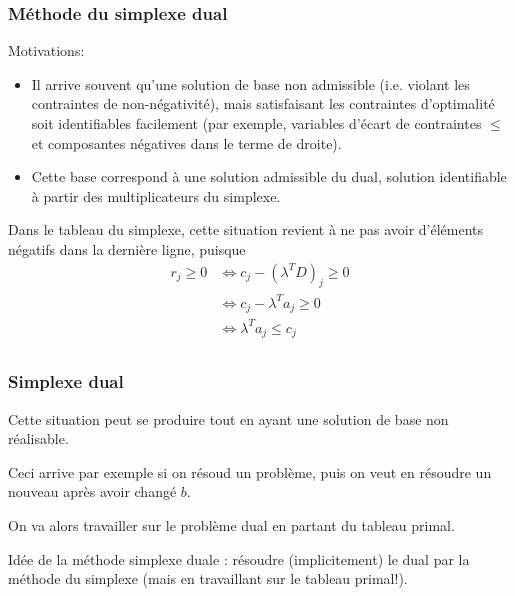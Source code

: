 \documentclass[usepdftitle=false]{beamer}
\begin{document}
\begin{frame}
\frametitle{Méthode du simplexe dual}

Motivations:
\begin{itemize}
\item
Il arrive souvent qu’une solution de base non admissible (i.e. violant les contraintes de non-négativité), mais satisfaisant les contraintes d'optimalité soit identifiables facilement (par exemple, variables d’écart de contraintes $\leq$ et composantes négatives dans le terme de droite).
\item
Cette base correspond à une solution admissible du dual, solution identifiable à partir des multiplicateurs du simplexe.
\end{itemize}


\mbox{}

Dans le tableau du simplexe, cette situation revient à ne pas avoir d'éléments négatifs dans la dernière ligne, puisque
\begin{align*}
r_{j} \geq 0 
& \Leftrightarrow c_{j} - (\lambda^T D)_j \geq 0 \\
& \Leftrightarrow c_{j} - \lambda^T a_j \geq 0 \\
& \Leftrightarrow \lambda^T a_j \leq c_j \\
\end{align*}

\end{frame}

\begin{frame}
\frametitle{Simplexe dual}

Cette situation peut se produire tout en ayant une solution de base non réalisable.

\mbox{}

Ceci arrive par exemple si on résoud un problème, puis on veut en résoudre un nouveau après avoir changé $b$.

\mbox{}
 
On va alors travailler sur le problème dual en partant du tableau primal.

\mbox{}

Idée de la méthode simplexe duale : résoudre (implicitement) le dual par la méthode du simplexe (mais en travaillant sur le tableau primal!).

\end{frame}
\end{document}
